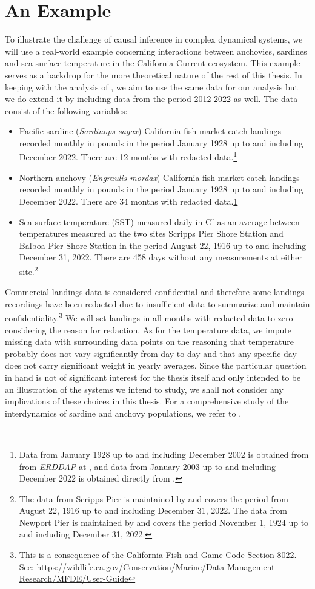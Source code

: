 \documentclass[11pt, a4paper]{memoir}
\theoremstyle{break}
\theoremstyle{break}
\theoremstyle{nonumberplain}
\begin{document}
\section{An Example}
To illustrate the challenge of causal inference in complex dynamical systems, we will use a real-world example concerning interactions between anchovies, sardines and sea surface temperature in the California Current ecosystem. This example serves as a backdrop for the more theoretical nature of the rest of this thesis. In keeping with the analysis of \cite{Sugihara}, we aim to use the same data for our analysis but we do extend it by including data from the period 2012-2022 as well. The data consist of the following variables:
\begin{itemize}
\item Pacific sardine (\textit{Sardinops sagax}) California fish market catch landings recorded monthly in pounds in the period January 1928 up to and including December 2022. There are 12 months with redacted data.\footnote{\label{note1}Data from January 1928 up to and including December 2002 is obtained from from \textit{ERDDAP} at \cite{oldData}, and data from January 2003 up to and including December 2022 is obtained directly from \cite{newData}.}
\item Northern anchovy (\textit{Engraulis mordax}) California fish market catch landings recorded monthly in pounds in the period January 1928 up to and including December 2022. There are 34 months with redacted data.\cref{note1} 
\item  Sea-surface temperature (SST) measured daily in $\text{C}^\circ$ as an average between temperatures measured at the two sites Scripps Pier Shore Station and Balboa Pier Shore Station in the period August 22, 1916 up to and including December 31, 2022. There are 458 days without any measurements at either site.\footnote{The data from Scripps Pier is maintained by \cite{Scripps} and covers the period from August 22, 1916 up to and including December 31, 2022. The data from Newport Pier is maintained by \cite{Newport} and covers the period November 1, 1924 up to and including December 31, 2022.} 
\end{itemize}
Commercial landings data is considered confidential and therefore some landings recordings have been redacted due to insufficient data to summarize and maintain confidentiality.\footnote{This is a consequence of the California Fish and Game Code Section 8022. See: \url{https://wildlife.ca.gov/Conservation/Marine/Data-Management-Research/MFDE/User-Guide}} We will set landings in all months with redacted data to zero considering the reason for redaction. As for the temperature data, we impute missing data with surrounding data points on the reasoning that temperature probably does not vary significantly from day to day and that any specific day does not carry significant weight in yearly averages. Since the particular question in hand is not of significant interest for the thesis itself and only intended to be an illustration of the systems we intend to study, we shall not consider any implications of these choices in this thesis. For a comprehensive study of the interdynamics of sardine and anchovy populations, we refer to \cite{Sardine}.\\\\
\end{document}
